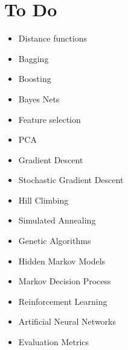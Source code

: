 \documentclass[12pt]{article}
\begin{document}
\section{To Do}

\begin{itemize}
	\item Distance functions
	\item Bagging
	\item Boosting
	\item Bayes Nets
	\item Feature selection
	\item PCA
	\item Gradient Descent
	\item Stochastic Gradient Descent
	\item Hill Climbing
	\item Simulated Annealing
	\item Genetic Algorithms
	\item Hidden Markov Models
	\item Markov Decision Process
	\item Reinforcement Learning
	\item Artificial Neural Networks
	\item Evaluation Metrics
\end{itemize}
\end{document}
